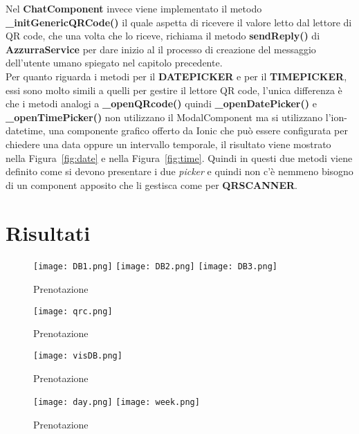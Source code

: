   Nel \textbf{ChatComponent} invece viene implementato il metodo \textbf{\_initGenericQRCode()} il quale aspetta di ricevere il valore letto dal lettore di QR code, che una volta che lo riceve, richiama il metodo \textbf{sendReply()} di \textbf{AzzurraService} per dare inizio al il processo di creazione del messaggio dell'utente umano spiegato nel capitolo precedente. \\
  
  Per quanto riguarda i metodi per il \textbf{DATEPICKER} e per il \textbf{TIMEPICKER}, essi sono molto simili a quelli per gestire il lettore QR code, l'unica differenza è che i metodi analogi a \textbf{\_openQRcode()} quindi \textbf{\_openDatePicker()} e \textbf{\_openTimePicker()} non utilizzano il ModalComponent ma si utilizzano l'ion-datetime, una componente grafico offerto da Ionic che può essere configurata per chiedere una data oppure un intervallo temporale, il risultato viene mostrato nella Figura~\ref{fig:date} e nella Figura~\ref{fig:time}. Quindi in questi due metodi viene definito come si devono presentare i due \emph{picker} e quindi non c'è nemmeno bisogno di un component apposito che li gestisca come per \textbf{QRSCANNER}.
\section{Risultati}

\begin{figure}[h]
	\begin{center}
		\texttt{[image: DB1.png]}
		\texttt{[image: DB2.png]}
		\texttt{[image: DB3.png]}
		\caption{Prenotazione}\label{fig:DB}
	\end{center}
\end{figure}

\begin{figure}[h]
	\begin{center}
		\texttt{[image: qrc.png]}
		\caption{Prenotazione}\label{fig:QRc}
	\end{center}
\end{figure}

\begin{figure}[h]
	\begin{center}
		\texttt{[image: visDB.png]}
		\caption{Prenotazione}\label{fig:visDB}
	\end{center}
\end{figure}

\begin{figure}[h]
	\begin{center}
		\texttt{[image: day.png]}
		\texttt{[image: week.png]}
		\caption{Prenotazione}\label{fig:planning}
	\end{center}
\end{figure}